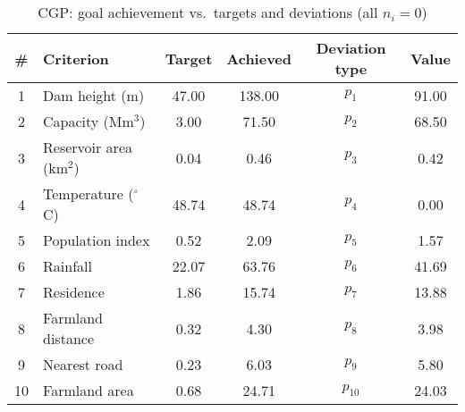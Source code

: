 \begin{table}[htbp]
\centering
\caption{CGP: goal achievement vs.\ targets and deviations (all $n_i=0$)}
\label{tab:cgpAchievementVsTarget}
\begin{tabular}{clcccc}
\hline
\textbf{\#} & \textbf{Criterion} & \textbf{Target} & \textbf{Achieved} & \textbf{Deviation type} & \textbf{Value} \\
\hline
1  & Dam height (m)              & 47.00   & 138.00  & $p_{1}$ & 91.00 \\
2  & Capacity (Mm$^{3}$)         & 3.00    & 71.50   & $p_{2}$ & 68.50 \\
3  & Reservoir area (km$^{2}$)   & 0.04    & 0.46    & $p_{3}$ & 0.42  \\
4  & Temperature ($^{\circ}$C)      & 48.74   & 48.74   & $p_{4}$ & 0.00  \\
5  & Population index            & 0.52    & 2.09    & $p_{5}$ & 1.57  \\
6  & Rainfall                    & 22.07   & 63.76   & $p_{6}$ & 41.69 \\
7  & Residence                   & 1.86    & 15.74   & $p_{7}$ & 13.88 \\
8  & Farmland distance           & 0.32    & 4.30    & $p_{8}$ & 3.98  \\
9  & Nearest road                & 0.23    & 6.03    & $p_{9}$ & 5.80  \\
10 & Farmland area               & 0.68    & 24.71   & $p_{10}$& 24.03 \\
\hline
\end{tabular}
\end{table}
